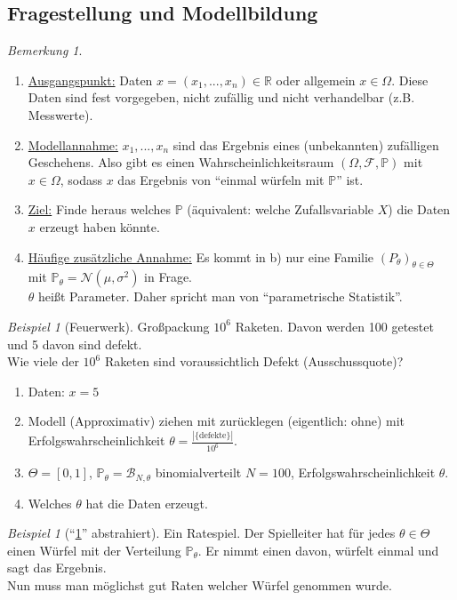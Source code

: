 \documentclass[10pt,a4paper]{article}
\newcommand{\R}{\ensuremath{\mathbb{R}}}
\newcommand{\Prb}{\mathbb P}
\newcommand{\scB}{\mathscr B}
\newcommand{\scF}{\ensuremath{\mathscr{F}}}
\newcommand{\Nv}{\mathscr N}
\theoremstyle{plain}
\theoremstyle{definition}
\theoremstyle{remark}
\newtheorem{bem}[theorem]{Bemerkung}
\newtheorem{exm}[theorem]{Beispiel}
\begin{document}
	\subsection{Fragestellung und Modellbildung}
	\begin{bem}
		\begin{enumerate}
			\item \underline{Ausgangspunkt:} Daten $x=(x_1,...,x_n)\in\R$ oder allgemein $x\in\Omega$. Diese Daten sind fest vorgegeben, nicht zufällig und nicht verhandelbar (z.B. Messwerte).
			\item \underline{Modellannahme:} $x_1,...,x_n$ sind das Ergebnis eines (unbekannten) zufälligen Geschehens. Also gibt es einen Wahrscheinlichkeitsraum $(\Omega,\scF,\Prb)$ mit $x\in\Omega$, sodass $x$ das Ergebnis von \enquote{einmal würfeln mit $\Prb$} ist.
			\item \underline{Ziel:} Finde heraus welches $\Prb$ (äquivalent: welche Zufallsvariable $X$) die Daten $x$ erzeugt haben könnte.
			\item \underline{Häufige zusätzliche Annahme:} Es kommt in b) nur eine Familie $(P_\theta)_{\theta\in\Theta}$ mit $\Prb_\theta=\Nv(\mu,\sigma^2)$ in Frage.\\
			$\theta$ heißt Parameter. Daher spricht man von \enquote{parametrische Statistik}.
		\end{enumerate}
	\end{bem}
	\begin{exm}[Feuerwerk]\label{0602exm}
		Großpackung $10^6$ Raketen. Davon werden 100 getestet und 5 davon sind defekt.\\
		Wie viele der $10^6$ Raketen sind voraussichtlich Defekt (Ausschussquote)?
		\begin{enumerate}
			\item Daten: $x=5$
			\item Modell (Approximativ) ziehen mit zurücklegen (eigentlich: ohne) mit Erfolgswahrscheinlichkeit $\theta=\frac{|\{\text{defekte}\}|}{10^6}$.
			\item $\Theta=[0,1]$, $\Prb_\theta=\scB_{N,\theta}$ binomialverteilt $N=100$, Erfolgswahrscheinlichkeit $\theta$.
			\addtocounter{enumi}{-2}
			\item Welches $\theta$ hat die Daten erzeugt.
		\end{enumerate}
	\end{exm}
	\begin{exm}[\enquote{\ref{0602exm}} abstrahiert]
		Ein Ratespiel. Der Spielleiter hat für jedes $\theta\in\Theta$ einen Würfel mit der Verteilung $\Prb_\theta$. Er nimmt einen davon, würfelt einmal und sagt das Ergebnis.\\
		Nun muss man möglichst gut Raten welcher Würfel genommen wurde.
	\end{exm}
\end{document}
